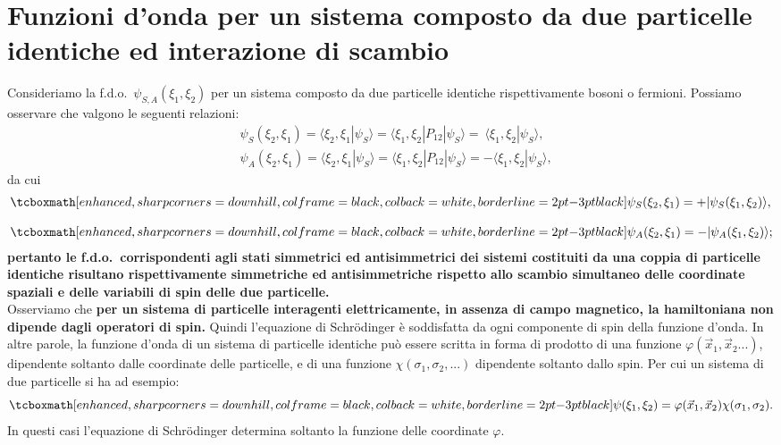 \documentclass[a4paper,12pt,oneside]{book}
\begin{document}
\section{Funzioni d'onda per un sistema  composto da due particelle identiche  ed interazione di scambio}
Consideriamo la f.d.o.~$\psi_{S,A} (\xi_1 ,\xi_2)$ per un sistema composto da due particelle identiche rispettivamente bosoni o fermioni. Possiamo osservare che valgono le seguenti relazioni:
	\begin{align}
		& \psi_S (\xi_2, \xi_1) =\langle \xi_2, \xi_1|\psi_S\rangle= \langle \xi_1, \xi_2|P_{12}|\psi_S\rangle=~\langle \xi_1, \xi_2|\psi_S \rangle  , \\[0.3cm] 
		& \psi_A (\xi_2, \xi_1) =\langle \xi_2, \xi_1|\psi_S\rangle= \langle \xi_1, \xi_2|P_{12}|\psi_S\rangle=-\langle \xi_1, \xi_2|\psi_S\rangle ,
	\end{align}
da cui
	\begin{align}
		&\tcboxmath[enhanced, sharp corners=downhill, colframe=black, colback=white, borderline={2pt}{-3pt}{black}]{
			\psi_S (\xi_2, \xi_1) = +|\psi_S(\xi_1, \xi_2)\rangle ,
		}\\[0.3cm]
		&\tcboxmath[enhanced, sharp corners=downhill, colframe=black, colback=white, borderline={2pt}{-3pt}{black}]{
			\psi_A (\xi_2, \xi_1) = -|\psi_A(\xi_1, \xi_2)\rangle ;
		}
	\end{align}
\textbf{pertanto le f.d.o.~corrispondenti agli stati simmetrici ed antisimmetrici dei sistemi costituiti da una coppia di particelle identiche risultano rispettivamente simmetriche ed antisimmetriche rispetto allo scambio simultaneo delle coordinate spaziali e delle variabili di spin delle due particelle.}\\

Osserviamo che \textbf{per un sistema di particelle interagenti elettricamente, in assenza di campo magnetico, la hamiltoniana non dipende dagli operatori di spin.} Quindi l'equazione di Schr\"{o}dinger è soddisfatta da ogni componente di spin della funzione d'onda. In altre parole, la funzione d'onda di un sistema di particelle identiche può essere scritta in forma di prodotto di una funzione $\varphi(\vec{x}_1, \vec{x}_2...)$, dipendente soltanto dalle coordinate delle particelle, e di una funzione $\chi(\sigma_1,\sigma_2,...)$ dipendente soltanto dallo spin. Per cui un sistema di due particelle si ha ad esempio:
	\begin{equation}
		\tcboxmath[enhanced, sharp corners=downhill, colframe=black, colback=white, borderline={2pt}{-3pt}{black}]{
			\psi(\xi_1, \xi_2)= \varphi(\vec{x}_1, \vec{x}_2)\chi(\sigma_1, \sigma_2) .
			}
	\end{equation}
In questi casi l'equazione di Schr\"{o}dinger determina soltanto la funzione delle coordinate $\varphi$.\\
\end{document}
